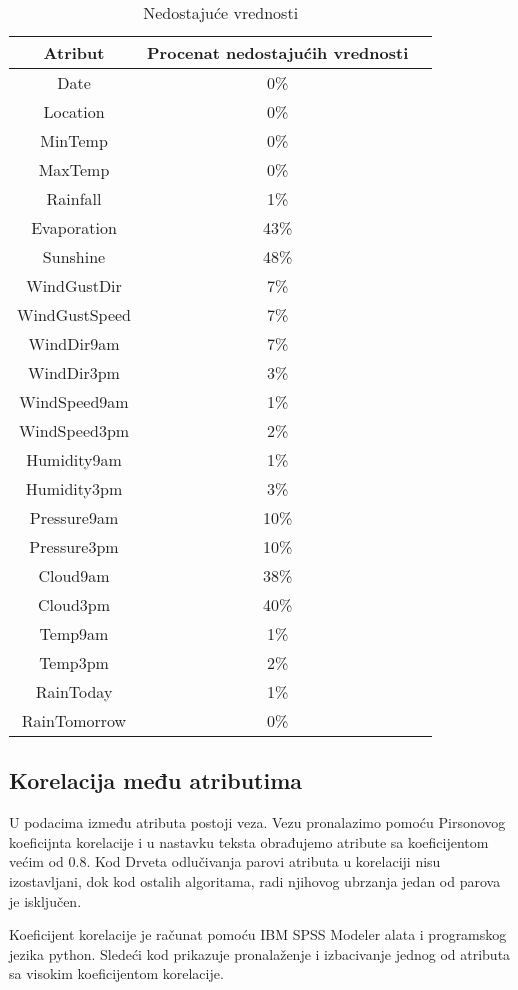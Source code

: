 \documentclass[a4paper]{article}
\begin{document}
\begin{table}[h]
\begin{center}
\caption{Nedostajuće vrednosti}
\label{tab:nans}
\begin{tabular}{|c|c|c|} \hline
\textbf{Atribut} & \textbf{Procenat nedostajućih vrednosti}\\ \hline
Date & 0\% \\ \hline
Location & 0\% \\ \hline
MinTemp & 0\% \\ \hline
MaxTemp & 0\% \\ \hline
Rainfall & 1\% \\ \hline
Evaporation & 43\% \\ \hline
Sunshine & 48\% \\ \hline
WindGustDir & 7\% \\ \hline
WindGustSpeed & 7\% \\ \hline
WindDir9am & 7\% \\ \hline
WindDir3pm & 3\% \\ \hline
WindSpeed9am & 1\% \\ \hline
WindSpeed3pm & 2\% \\ \hline
Humidity9am & 1\% \\ \hline
Humidity3pm & 3\% \\ \hline
Pressure9am & 10\% \\ \hline
Pressure3pm & 10\% \\ \hline
Cloud9am & 38\% \\ \hline
Cloud3pm & 40\% \\ \hline
Temp9am & 1\% \\ \hline
Temp3pm & 2\% \\ \hline
RainToday & 1\% \\ \hline
RainTomorrow & 0\% \\ \hline
\end{tabular}
\end{center}
\end{table}

\subsection{Korelacija među atributima}
\label{subsec:korelacija}
U podacima između atributa postoji veza. Vezu pronalazimo pomoću Pirsonovog koeficijnta korelacije i u nastavku teksta obrađujemo atribute sa koeficijentom većim od 0.8. Kod Drveta odlučivanja parovi atributa u korelaciji nisu izostavljani, dok kod ostalih algoritama, radi njihovog  ubrzanja jedan od parova je isključen. \par
Koeficijent korelacije je računat pomoću IBM SPSS Modeler alata i programskog jezika python. Sledeći kod prikazuje pronalaženje i izbacivanje jednog od atributa sa visokim koeficijentom korelacije.\par

\end{document}
